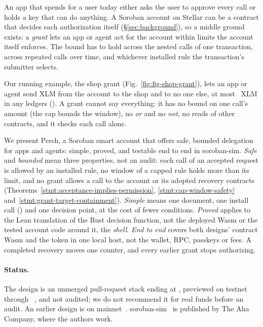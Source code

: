 An app that spends for a user today either asks the user to approve every call
or holds a key that can do anything. A Soroban account on Stellar can be a
contract that decides each authorization itself (\S\ref{sec:background}), so a
middle ground exists: a \emph{grant} lets an app or agent act for the account
within limits the account itself enforces. The bound has to hold across the
nested calls of one transaction, across repeated calls over time, and whichever
installed rule the transaction's submitter selects.

Our running example, the shop grant (Fig.~\ref{fig:fig-shop-grant}), lets an
app or agent send XLM from the account to the shop and to no one else, at most
~XLM in any  ledgers
(). A grant cannot say everything: it has no bound on
one call's amount (the cap bounds the window), no \emph{or} and no \emph{not},
no reads of other contracts, and it checks each call alone.


We present Perch, a Soroban smart account that offers safe, bounded delegation
for apps and agents: simple, proved, and testable end to end in soroban-sim.
\emph{Safe} and \emph{bounded} mean three properties, not an audit: each call of
an accepted request is allowed by an installed rule, no window of a capped rule holds more than its
limit, and no grant allows a call to the account or its adopted recovery
contracts (Theorems~\ref{stmt:acceptance-implies-permission},
\ref{stmt:cap-window-safety} and~\ref{stmt:grant-target-containment}).
\emph{Simple} means one document, one install call
() and one decision point, at the cost of fewer conditions.
\emph{Proved} applies to the Lean translation of the Rust decision function,
not the deployed Wasm or the tested account code around it, the \emph{shell}. \emph{End to end} covers both designs' contract Wasm and
the token in one local host, not the wallet, RPC, passkeys or fees. A completed
recovery moves one counter, and every earlier grant stops authorizing.

\paragraph{Status.} The design is an unmerged pull-request stack ending at
, previewed on testnet through
~, and not audited; we do not recommend it for real
funds before an audit. An earlier design is on mainnet~. \ifdefined\anonymous\else
soroban-sim~\cite{soroban-sim} is published by The Aha Company, where the
authors work.\fi

